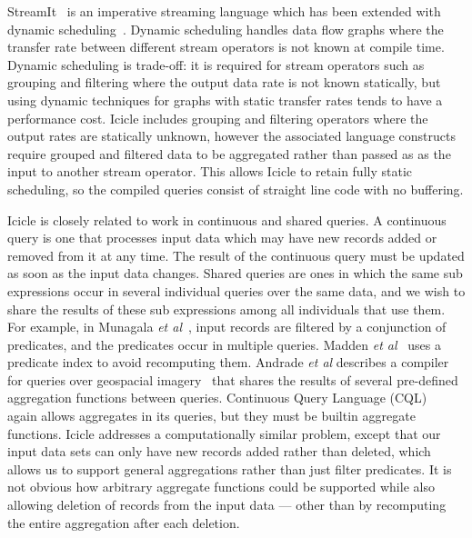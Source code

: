 StreamIt~\cite{thies2002streamit} is an imperative streaming language which has been extended with dynamic scheduling~\cite{soule2013dynamic}. Dynamic scheduling handles data flow graphs where the transfer rate between different stream operators is not known at compile time. Dynamic scheduling is trade-off: it is required for stream operators such as grouping and filtering where the output data rate is not known statically, but using dynamic techniques for graphs with static transfer rates tends to have a performance cost. Icicle includes grouping and filtering operators where the output rates are statically unknown, however the associated language constructs require grouped and filtered data to be aggregated rather than passed as as the input to another stream operator. This allows Icicle to retain fully static scheduling, so the compiled queries consist of straight line code with no buffering.

Icicle is closely related to work in continuous and shared queries. A continuous query is one that processes input data which may have new records added or removed from it at any time. The result of the continuous query must be updated as soon as the input data changes. Shared queries are ones in which the same sub expressions occur in several individual queries over the same data, and we wish to share the results of these sub expressions among all individuals that use them. For example, in Munagala \emph{et al}~\cite{munagala2007optimization}, input records are filtered by a conjunction of predicates, and the predicates occur in multiple queries. Madden \emph{et al}~\cite{madden2002continuously} uses a predicate index to avoid recomputing them. Andrade \emph{et al} describes a compiler for queries over geospacial imagery~\cite{andrade2003efficient} that shares the results of several pre-defined aggregation functions between queries. Continuous Query Language (CQL)~\cite{arasu2002abstract,stream2003stream} again allows aggregates in its queries, but they must be builtin aggregate functions. Icicle addresses a computationally similar problem, except that our input data sets can only have new records added rather than deleted, which allows us to support general aggregations rather than just filter predicates. It is not obvious how arbitrary aggregate functions could be supported while also allowing deletion of records from the input data --- other than by recomputing the entire aggregation after each deletion.



